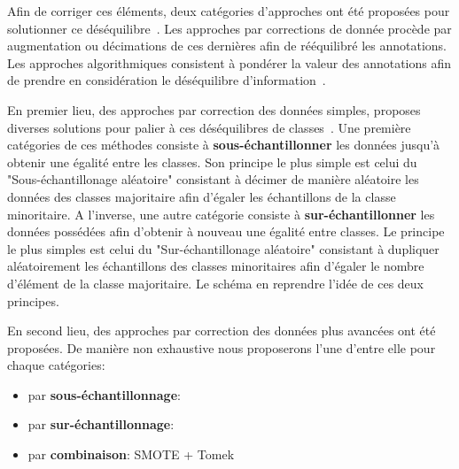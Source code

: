 Afin de corriger ces éléments, deux catégories d'approches ont été proposées pour solutionner ce déséquilibre~\cite{Huang2013}. Les approches par corrections de donnée procède par augmentation ou décimations de ces dernières afin de rééquilibré les annotations. Les approches algorithmiques consistent à pondérer la valeur des annotations afin de prendre en considération le déséquilibre d'information~\cite{Ting2002,He2009,Thai2010}.\par

En premier lieu, des approches par correction des données simples, proposes diverses solutions pour palier à ces déséquilibres de classes~\cite{Prati2009, He2009}. Une première catégories de ces méthodes consiste à \textbf{sous-échantillonner} les données jusqu'à obtenir une égalité entre les classes. Son principe le plus simple est celui du "Sous-échantillonage aléatoire" consistant à décimer de manière aléatoire les données des classes majoritaire afin d'égaler les échantillons de la classe minoritaire. A l'inverse, une autre catégorie consiste à \textbf{sur-échantillonner} les données possédées afin d'obtenir à nouveau une égalité entre classes. Le principe le plus simples est celui du "Sur-échantillonage aléatoire" consistant à dupliquer aléatoirement les échantillons des classes minoritaires afin d'égaler le nombre d'élément de la classe majoritaire. Le schéma en  reprendre l'idée de ces deux principes.\par

En second lieu, des approches par correction des données plus avancées ont été proposées. De manière non exhaustive nous proposerons l'une d'entre elle pour chaque catégories:
\begin{itemize}
    \item par \textbf{sous-échantillonnage}: \cite{Tomek1976}
    \item par \textbf{sur-échantillonnage}:\cite{Chawla2002} 
    \item par \textbf{combinaison}: SMOTE + Tomek
\end{itemize}\par

